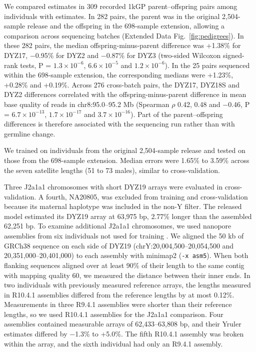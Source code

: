 We compared estimates in 309 recorded 1kGP parent--offspring pairs among individuals with estimates. In 282 pairs, the parent was in the original 2,504-sample release and the offspring in the 698-sample extension, allowing a comparison across sequencing batches (Extended Data Fig.~\ref{fig:pedigrees}). In these 282 pairs, the median offspring-minus-parent difference was +1.38\% for DYZ17, $-$0.95\% for DYZ2 and $-$0.87\% for DYZ3 (two-sided Wilcoxon signed-rank tests, P = $1.3\times10^{-6}$, $6.6\times10^{-5}$ and $1.2\times10^{-6}$). In the 25 pairs sequenced within the 698-sample extension, the corresponding medians were +1.23\%, +0.28\% and +0.19\%. Across 276 cross-batch pairs, the DYZ17, DYZ18S and DYZ2 differences correlated with the offspring-minus-parent difference in mean base quality of reads in chr8:95.0--95.2 Mb (Spearman $\rho$ 0.42, 0.48 and $-$0.46, P = $6.7\times10^{-13}$, $1.7\times10^{-17}$ and $3.7\times10^{-16}$). Part of the parent--offspring differences is therefore associated with the sequencing run rather than with germline change.

We trained on individuals from the original 2,504-sample release and tested on those from the 698-sample extension. Median errors were 1.65\% to 3.59\% across the seven satellite lengths (51 to 73 males), similar to cross-validation.

Three J2a1a1 chromosomes with short DYZ19 arrays were evaluated in cross-validation. A fourth, NA20805, was excluded from training and cross-validation because its maternal haplotype was included in the non-Y filter. The released model estimated its DYZ19 array at 63,975 bp, 2.77\% longer than the assembled 62,251 bp. To examine additional J2a1a1 chromosomes, we used nanopore assemblies from six individuals not used for training \cite{Gustafson2024}. We aligned the 50 kb of GRCh38 sequence on each side of DYZ19 (chrY:20,004,500--20,054,500 and 20,351,000--20,401,000) to each assembly with minimap2 (\texttt{-x asm5}). When both flanking sequences aligned over at least 90\% of their length to the same contig with mapping quality 60, we measured the distance between their inner ends. In two individuals with previously measured reference arrays, the lengths measured in R10.4.1 assemblies differed from the reference lengths by at most 0.12\%. Measurements in three R9.4.1 assemblies were shorter than their reference lengths, so we used R10.4.1 assemblies for the J2a1a1 comparison. Four assemblies contained measurable arrays of 62,433--63,808 bp, and their Yruler estimates differed by $-$1.3\% to +5.0\%. The fifth R10.4.1 assembly was broken within the array, and the sixth individual had only an R9.4.1 assembly.

